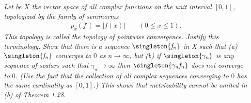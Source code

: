 \noindent
\textit{
Let be $X$ the vector space of all complex functions on the unit interval 
$[0, 1]$, topologized by the family of seminorms 
%
  \begin{align}
    \mathit{p_{x}(f\,)=|f(x)|} \quad\quad (0\leq x\leq 1).\nonumber
  \end{align}
%
This topology is called the topology of pointwise convergence. 
Justify this terminology.
Show that there is a sequence $\mathit{\singleton{f_n}}$ in X such that (a) %
%
$\mathit{\singleton{f_n}}$ converges to $0$ as $\mathit{n \to\infty}$, 
%
but (b) if $\mathit{\singleton{\gamma_n}}$ is any sequence of scalars such 
that $\mathit{\gamma_n\to\infty}$ then $\mathit{\singleton{\gamma_n f_n}}$ %
does not converge to $0$. 
(Use the fact that the collection of all complex sequences converging to $0$ 
has the same cardinality as $[0, 1]$.)
This shows that metrizability cannot be omited in (b) of Theorem 1.28.
}
%
